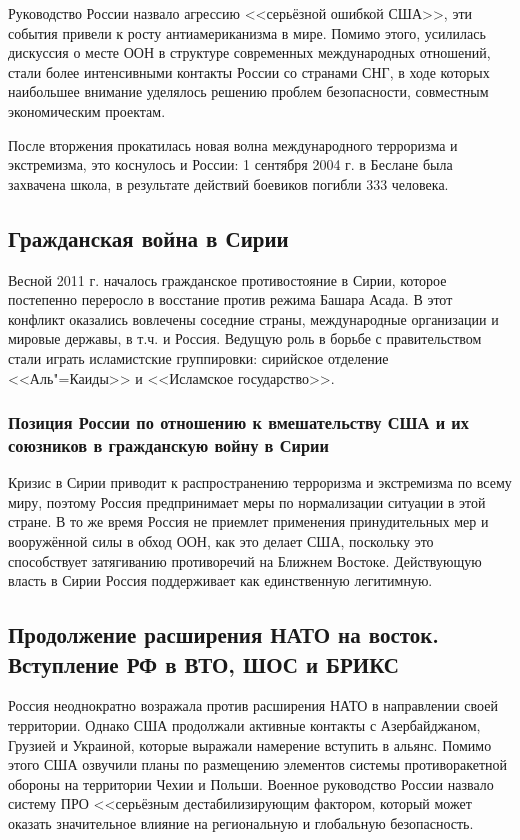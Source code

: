 Руководство России назвало агрессию <<серьёзной ошибкой США>>, эти события привели к росту антиамериканизма в мире. Помимо этого, усилилась дискуссия о месте ООН в структуре современных международных отношений, стали более интенсивными контакты России со странами СНГ, в ходе которых наибольшее внимание уделялось решению проблем безопасности, совместным экономическим проектам.

После вторжения прокатилась новая волна международного терроризма и экстремизма, это коснулось и России: 1 сентября 2004 г. в Беслане была захвачена школа, в результате действий боевиков погибли 333 человека.

\subsection{Гражданская война в Сирии}
Весной 2011 г. началось гражданское противостояние в Сирии, которое постепенно переросло в восстание против режима Башара Асада. В этот конфликт оказались вовлечены соседние страны, международные организации и мировые державы, в т.ч. и Россия. Ведущую роль в борьбе с правительством стали играть исламистские группировки: сирийское отделение <<Аль"=Каиды>> и <<Исламское государство>>.

\subsubsection{Позиция России по отношению к вмешательству США и их союзников в гражданскую войну в Сирии}
Кризис в Сирии приводит к распространению терроризма и экстремизма по всему миру, поэтому Россия предпринимает меры по нормализации ситуации в этой стране. В то же время Россия не приемлет применения принудительных мер и вооружённой силы в обход ООН, как это делает США, поскольку это способствует затягиванию противоречий на Ближнем Востоке. Действующую власть в Сирии Россия поддерживает как единственную легитимную.

\subsection{Продолжение расширения НАТО на восток. Вступление РФ в ВТО, ШОС и БРИКС}

Россия неоднократно возражала против расширения НАТО в направлении своей территории. Однако США продолжали активные контакты с Азербайджаном, Грузией и Украиной, которые выражали намерение вступить в альянс. Помимо этого США озвучили планы по размещению элементов системы противоракетной обороны на территории Чехии и Польши. Военное руководство России назвало систему ПРО <<серьёзным дестабилизирующим фактором, который может оказать значительное влияние на региональную и глобальную безопасность.

